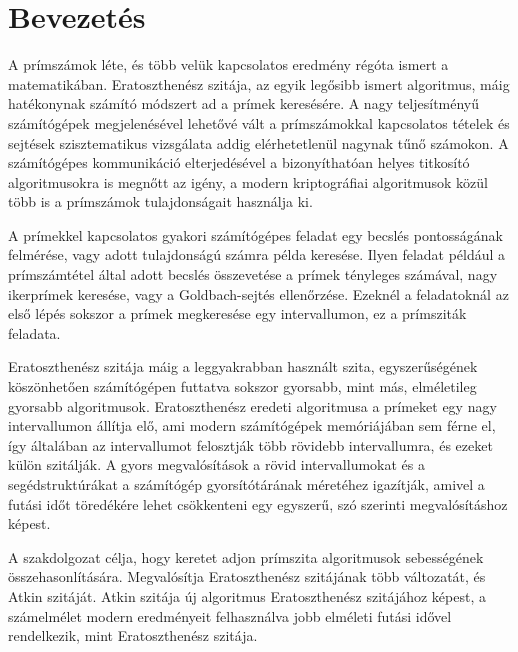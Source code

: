\documentclass[12pt]{report}
\begin{document}
\tableofcontents

\chapter{Bevezetés}

A prímszámok léte, és több velük kapcsolatos eredmény régóta ismert a matematikában.
Eratoszthenész szitája, az egyik legősibb ismert algoritmus, máig hatékonynak számító módszert ad a prímek keresésére.
A nagy teljesítményű számítógépek megjelenésével lehetővé vált a prímszámokkal kapcsolatos tételek és sejtések szisztematikus vizsgálata addig elérhetetlenül nagynak tűnő számokon.
A számítógépes kommunikáció elterjedésével a bizonyíthatóan helyes titkosító algoritmusokra is megnőtt az igény, a modern kriptográfiai algoritmusok közül több is a prímszámok tulajdonságait használja ki.

A prímekkel kapcsolatos gyakori számítógépes feladat egy becslés pontosságának felmérése, vagy adott tulajdonságú számra példa keresése.
Ilyen feladat például a prímszámtétel által adott becslés összevetése a prímek tényleges számával, nagy ikerprímek keresése\cite{twinprimes}, vagy a Goldbach-sejtés ellenőrzése\cite{gaps}.
Ezeknél a feladatoknál az első lépés sokszor a prímek megkeresése egy intervallumon, ez a prímsziták feladata.

Eratoszthenész szitája máig a leggyakrabban használt szita, egyszerűségének köszönhetően számítógépen futtatva sokszor gyorsabb, mint más, elméletileg gyorsabb algoritmusok.
Eratoszthenész eredeti algoritmusa a prímeket egy nagy intervallumon állítja elő, ami modern számítógépek memóriájában sem férne el, így általában az intervallumot felosztják több rövidebb intervallumra, és ezeket külön szitálják.
A gyors megvalósítások a rövid intervallumokat és a segédstruktúrákat a számítógép gyorsítótárának méretéhez igazítják, amivel a futási időt töredékére lehet csökkenteni egy egyszerű, szó szerinti megvalósításhoz képest.

A szakdolgozat célja, hogy keretet adjon prímszita algoritmusok sebességének összehasonlítására.
Megvalósítja Eratoszthenész szitájának több változatát, és Atkin szitáját\cite{atkin}.
Atkin szitája új algoritmus Eratoszthenész szitájához képest, a számelmélet modern eredményeit felhasználva jobb elméleti futási idővel rendelkezik, mint Eratoszthenész szitája.


\end{document}
